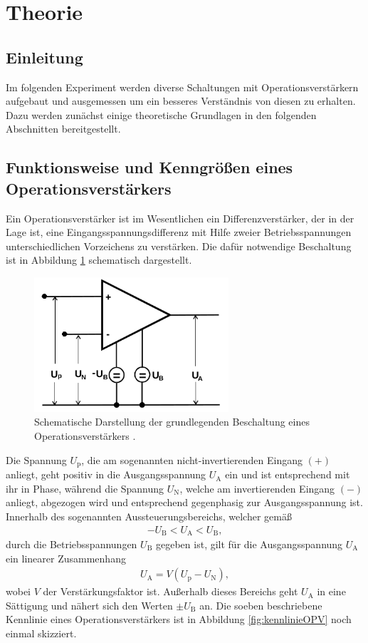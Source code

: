 \section{Theorie}
\label{sec:Theorie}

\subsection{Einleitung}

Im folgenden Experiment werden diverse Schaltungen mit Operationsverstärkern
aufgebaut und ausgemessen um ein besseres Verständnis von diesen zu erhalten.
Dazu werden zunächst einige theoretische Grundlagen in den folgenden Abschnitten
bereitgestellt.

\subsection{Funktionsweise und Kenngrößen eines Operationsverstärkers}

Ein Operationsverstärker ist im Wesentlichen ein Differenzverstärker, der in der Lage ist, eine Eingangsspannungsdifferenz
mit Hilfe zweier Betriebsspannungen unterschiedlichen Vorzeichens zu verstärken.
Die dafür notwendige Beschaltung ist in Abbildung \ref{fig:OPVGrund} schematisch dargestellt.

\begin{figure}
  \centering
  \includegraphics[height=5cm]{ImmerDieseNorweger/OPVGrund.png}
  \caption{Schematische Darstellung der grundlegenden Beschaltung eines Operationsverstärkers \cite{anleitung}.}
  \label{fig:OPVGrund}
\end{figure}

Die Spannung $U_\text{p}$, die am sogenannten nicht-invertierenden Eingang $(+)$ anliegt, geht positiv
in die Ausgangsspannung $U_\text{A}$ ein und ist entsprechend mit ihr in Phase, während die Spannung $U_\text{N}$,
welche am invertierenden Eingang $(-)$ anliegt, abgezogen wird und entsprechend gegenphasig zur Ausgangsspannung ist.
Innerhalb des sogenannten Aussteuerungsbereichs, welcher gemäß
\begin{align}
  -U_\text{B} < U_\text{A} < U_\text{B},
\end{align}
durch die Betriebsspannungen $U_\text{B}$ gegeben ist, gilt für die Ausgangsspannung $U_\text{A}$ ein linearer Zusammenhang
\begin{align}
  U_\text{A} = V \left( U_\text{p} - U_\text{N} \right),
\end{align}
wobei $V$ der Verstärkungsfaktor ist. Außerhalb dieses Bereichs geht $U_\text{A}$ in eine
Sättigung und nähert sich den Werten $\pm U_\text{B}$ an.
Die soeben beschriebene Kennlinie eines Operationsverstärkers ist in Abbildung \ref{fig:kennlinieOPV}
noch einmal skizziert.

